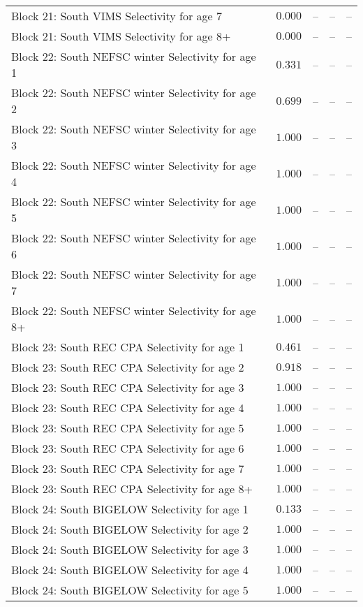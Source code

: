 \documentclass[
]{article}
\begin{document}
\begin{landscape}
\begin{longtable}[t]{lrrrr}
Block 21: South VIMS Selectivity for age 7 & $0.000$ & -- & -- & --\\
Block 21: South VIMS Selectivity for age 8+ & $0.000$ & -- & -- & --\\
\addlinespace
Block 22: South NEFSC winter Selectivity for age 1 & $0.331$ & -- & -- & --\\
Block 22: South NEFSC winter Selectivity for age 2 & $0.699$ & -- & -- & --\\
Block 22: South NEFSC winter Selectivity for age 3 & $1.000$ & -- & -- & --\\
Block 22: South NEFSC winter Selectivity for age 4 & $1.000$ & -- & -- & --\\
Block 22: South NEFSC winter Selectivity for age 5 & $1.000$ & -- & -- & --\\
\addlinespace
Block 22: South NEFSC winter Selectivity for age 6 & $1.000$ & -- & -- & --\\
Block 22: South NEFSC winter Selectivity for age 7 & $1.000$ & -- & -- & --\\
Block 22: South NEFSC winter Selectivity for age 8+ & $1.000$ & -- & -- & --\\
Block 23: South REC CPA Selectivity for age 1 & $0.461$ & -- & -- & --\\
Block 23: South REC CPA Selectivity for age 2 & $0.918$ & -- & -- & --\\
\addlinespace
Block 23: South REC CPA Selectivity for age 3 & $1.000$ & -- & -- & --\\
Block 23: South REC CPA Selectivity for age 4 & $1.000$ & -- & -- & --\\
Block 23: South REC CPA Selectivity for age 5 & $1.000$ & -- & -- & --\\
Block 23: South REC CPA Selectivity for age 6 & $1.000$ & -- & -- & --\\
Block 23: South REC CPA Selectivity for age 7 & $1.000$ & -- & -- & --\\
\addlinespace
Block 23: South REC CPA Selectivity for age 8+ & $1.000$ & -- & -- & --\\
Block 24: South BIGELOW Selectivity for age 1 & $0.133$ & -- & -- & --\\
Block 24: South BIGELOW Selectivity for age 2 & $1.000$ & -- & -- & --\\
Block 24: South BIGELOW Selectivity for age 3 & $1.000$ & -- & -- & --\\
Block 24: South BIGELOW Selectivity for age 4 & $1.000$ & -- & -- & --\\
\addlinespace
Block 24: South BIGELOW Selectivity for age 5 & $1.000$ & -- & -- & --\\

\end{longtable}
\end{landscape}
\end{document}
